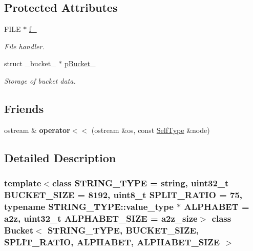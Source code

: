 \subsection*{Protected Attributes}
\begin{CompactItemize}
\item 
\hypertarget{classBucket_577e54cd52ed418a5fbea5a908b7db4a}{
FILE $\ast$ \hyperlink{classBucket_577e54cd52ed418a5fbea5a908b7db4a}{f\_\-}}
\label{classBucket_577e54cd52ed418a5fbea5a908b7db4a}

\begin{CompactList}\small\item\em File handler. \item\end{CompactList}\item 
\hypertarget{classBucket_5e43604904897a15775ee36c4ea4cc83}{
struct \_\-bucket\_\- $\ast$ \hyperlink{classBucket_5e43604904897a15775ee36c4ea4cc83}{pBucket\_\-}}
\label{classBucket_5e43604904897a15775ee36c4ea4cc83}

\begin{CompactList}\small\item\em Storage of bucket data. \item\end{CompactList}\end{CompactItemize}
\subsection*{Friends}
\begin{CompactItemize}
\item 
\hypertarget{classBucket_d6b3ef7ecb2e9975d8022514f68f74f5}{
ostream \& \textbf{operator$<$$<$} (ostream \&os, const \hyperlink{classBucket}{SelfType} \&node)}
\label{classBucket_d6b3ef7ecb2e9975d8022514f68f74f5}

\end{CompactItemize}


\subsection{Detailed Description}
\subsubsection*{template$<$class STRING\_\-TYPE = string, uint32\_\-t BUCKET\_\-SIZE = 8192, uint8\_\-t SPLIT\_\-RATIO = 75, typename STRING\_\-TYPE::value\_\-type $\ast$ ALPHABET = a2z, uint32\_\-t ALPHABET\_\-SIZE = a2z\_\-size$>$ class Bucket$<$ STRING\_\-TYPE, BUCKET\_\-SIZE, SPLIT\_\-RATIO, ALPHABET, ALPHABET\_\-SIZE $>$}

